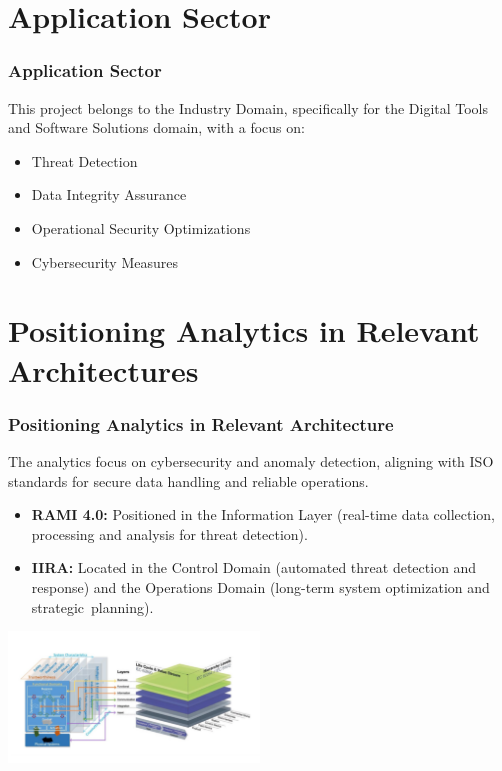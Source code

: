 \documentclass[10pt, a4paper]{beamer}
\begin{document}
\section{Application Sector}
\begin{frame}
	\frametitle{Application Sector}
	This project belongs to the Industry Domain, specifically for the Digital Tools and Software Solutions domain, with a focus on:
	
	\begin{block}{}
		\begin{itemize}
			\item Threat Detection
			\item Data Integrity Assurance
			\item Operational Security Optimizations
			\item Cybersecurity Measures
		\end{itemize}
	\end{block}
\end{frame}

\section{Positioning Analytics in Relevant Architectures}
\begin{frame}
	\frametitle{Positioning Analytics in Relevant Architecture}
The analytics focus on cybersecurity and anomaly detection, aligning with ISO standards for secure data handling and reliable operations.

	
	\begin{block}{}
		\begin{itemize}
		\item \textbf{RAMI 4.0:} Positioned in the Information Layer (real-time data collection, processing and analysis for threat detection).
		\item \textbf{IIRA:} Located in the Control Domain (automated threat detection and response) and the Operations Domain (long-term system optimization and strategic planning).
		\end{itemize}
	\end{block}
	
	\centering
	\includegraphics[width=0.5\textwidth]{images/RAMI_IIRA.png} %
	
	\centering
	
	
\end{frame}
\end{document}
